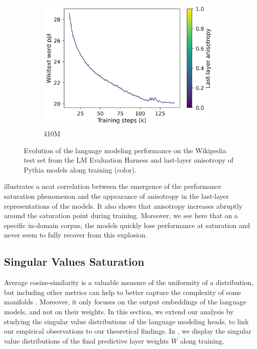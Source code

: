 \begin{figure}[ht!]
\begin{subfigure}{0.45\columnwidth}
         \includegraphics[width=\linewidth]{sources/part_1/softmax_bottleneck/imgs/anisotropy_explosion_410m.png}
         \caption{410M}
         \label{fig:410M}
    \end{subfigure}
    \caption{Evolution of the language modeling performance on the Wikipedia test set from the LM Evaluation Harness \citep{eval-harness} and last-layer anisotropy of Pythia models along training (color).}
    \label{fig:aniso_v_saturation}
\end{figure}

 illustrates a neat correlation between the emergence of the performance saturation phenomenon and the appearance of anisotropy in the last-layer representations of the models. It also shows that anisotropy increases abruptly around the saturation point during training. Moreover, we see here that on a specific in-domain corpus, the models quickly lose performance at saturation and never seem to fully recover from this explosion.

\subsection{Singular Values Saturation}
\label{sub:saturation}

Average cosine-similarity is a valuable measure of the uniformity of a distribution, but including other metrics can help to better capture the complexity of some manifolds \citep{rudman-etal-2022-isoscore}. Moreover, it only focuses on the output embeddings of the language models, and not on their weights. In this section, we extend our analysis by studying the singular value distributions of the language modeling heads, to link our empirical observations to our theoretical findings. In , we display the singular value distributions of the final predictive layer weights $W$ along training.

